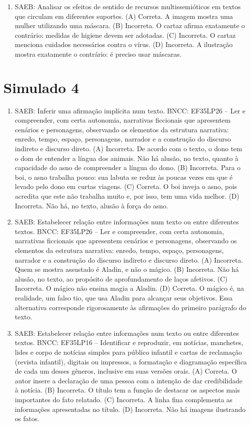 \begin{enumerate}
\item
SAEB: Analisar os efeitos de sentido de recursos multissemióticos em textos que circulam em diferentes suportes. 
(A) Correta. A imagem mostra uma mulher utilizando uma máscara. 
(B) Incorreta. O cartaz afirma exatamente o contrário: medidas de higiene devem ser adotadas. 
(C) Incorreta. O cartaz menciona cuidados necessários contra o vírus. 
(D) Incorreta. A ilustração mostra exatamente o contrário: é preciso
usar máscaras.
\end{enumerate}

\section*{Simulado 4}

\begin{enumerate}
\item
SAEB: Inferir uma afirmação implícita num texto. BNCC: EF35LP26 -- Ler e compreender, com certa autonomia, narrativas ficcionais que apresentem cenários e personagens, observando os elementos da estrutura narrativa: enredo, tempo, espaço, personagens, narrador e a construção do discurso indireto e discurso direto. 
(A) Incorreta. De acordo com o texto, o dono tem o dom de entender a língua dos animais. Não há alusão, no texto, quanto à capacidade do asno de compreender a língua do dono. 
(B) Incorreta. Para o boi, o asno trabalha pouco: sua labuta se reduz às poucas vezes em que é levado pelo dono em curtas viagens. 
(C) Correta. O boi inveja o asno, pois acredita que este não trabalha muito e, por isso, tem uma vida melhor.
(D) Incorreta. Não há, no texto, alusão à força do asno.

\item
SAEB: Estabelecer relação entre informações num texto ou entre diferentes textos. BNCC: EF35LP26 -- Ler e compreender, com certa autonomia, narrativas ficcionais que apresentem cenários e personagens, observando os elementos da estrutura narrativa: enredo, tempo, espaço, personagens, narrador e a construção do discurso indireto e discurso direto. 
(A) Incorreta. Quem se mostra assustado é Aladin, e não o mágico. 
(B) Incorreta. Não há alusão, no texto, ao propósito de aprofundamento de laços afetivos.
(C) Incorreta. O mágico não ensina magia a Aladin. 
(D) Correta. O mágico é, na realidade, um falso tio, que usa Aladin para alcançar seus objetivos. Essa alternativa corresponde rigorosamente às afirmações do primeiro parágrafo do texto.

\item
SAEB: Estabelecer relação entre informações num texto ou entre diferentes textos. BNCC: EF35LP16 -- Identificar e reproduzir, em notícias, manchetes, lides e corpo de notícias simples para público infantil e cartas de reclamação (revista infantil), digitais ou impressos, a formatação e diagramação específica de cada um desses gêneros, inclusive em suas versões orais. 
(A) Correta. O autor insere a declaração de uma pessoa com a intenção de dar credibilidade à notícia. 
(B) Incorreta. O título tem a função de destacar os aspectos mais importantes do fato relatado. 
(C) Incorreta. A linha fina complementa as informações apresentadas no título. 
(D) Incorreta. Não há imagens ilustrando os fatos.


\end{enumerate}
